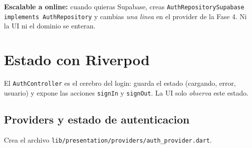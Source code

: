 \documentclass[11pt,a4paper,oneside]{book}
\newcommand{\file}[1]{\texttt{\textcolor{brandDark}{#1}}}
\begin{document}
\begin{tipbox}
\textbf{Escalable a online:} cuando quieras Supabase, creas
\texttt{AuthRepositorySupabase implements AuthRepository} y cambias \emph{una linea}
en el provider de la Fase 4. Ni la UI ni el dominio se enteran.
\end{tipbox}

\chapter{Estado con Riverpod}
El \file{AuthController} es el cerebro del login: guarda el estado (cargando, error,
usuario) y expone las acciones \texttt{signIn} y \texttt{signOut}. La UI solo
\emph{observa} este estado.

\section{Providers y estado de autenticacion}
\begin{wherebox}
Crea el archivo \file{lib/presentation/providers/auth\_provider.dart}.
\end{wherebox}
\end{document}
